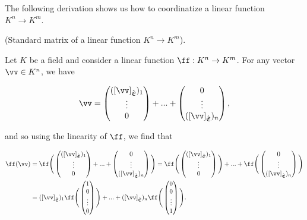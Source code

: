 The following derivation shows us how to coordinatize a linear function $K^n \rightarrow K^m$.

\begin{deriv}
\label{ch::lin_alg::deriv::standard_matrix}
    (Standard matrix of a linear function $K^n \rightarrow K^m$). 
    
    Let $K$ be a field and consider a linear function $\ff:K^n \rightarrow K^m$. For any vector $\vv \in K^n$, we have 
    
    \begin{align*}
        \vv =
        \begin{pmatrix} ([\vv]_\sE)_1 \\ \vdots \\ 0 \end{pmatrix} + ... + \begin{pmatrix} 0 \\ \vdots \\ ([\vv]_\sE)_n \end{pmatrix},
    \end{align*}
    
    and so using the linearity of $\ff$, we find that
    
    \begin{align*}
        \ff(\vv) &= 
        \ff
        \Bigg(
            \begin{pmatrix} ([\vv]_\sE)_1 \\ \vdots \\ 0 \end{pmatrix} + ... + \begin{pmatrix} 0 \\ \vdots \\ ([\vv]_\sE)_n \end{pmatrix}
        \Bigg)
        =
        \ff \Bigg( 
        \begin{pmatrix} 
                ([\vv]_\sE)_1 \\ \vdots \\ 0 
        \end{pmatrix} \Bigg)
        +
        ...
        +
        \ff \Bigg(
        \begin{pmatrix} 
                0 \\ \vdots \\ ([\vv]_\sE)_n 
        \end{pmatrix} \Bigg) \\
        &=
        ([\vv]_\sE)_1
        \ff \Bigg(
        \begin{pmatrix} 
                1 \\ 0 \\ \vdots \\ 0 
        \end{pmatrix} \Bigg)
        +
        ...
        +
        ([\vv]_\sE)_n
        \ff \Bigg(
        \begin{pmatrix} 
                0 \\ 0 \\ \vdots \\ 1 
        \end{pmatrix} \Bigg).
    \end{align*}
    

\end{deriv}
